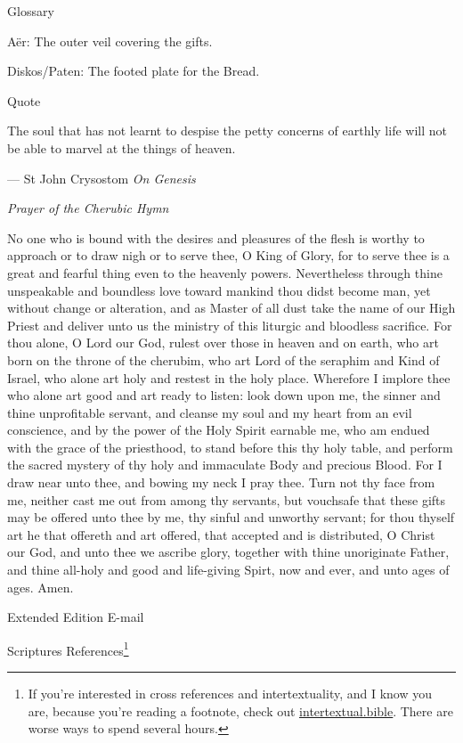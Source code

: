 \documentclass[
]{article}
\begin{document}
Glossary

Aër: The outer veil covering the gifts.

Diskos/Paten: The footed plate for the Bread.

Quote

The soul that has not learnt to despise the petty concerns of earthly
life will not be able to marvel at the things of heaven.

--- St John Crysostom \emph{On Genesis}

\emph{Prayer of the Cherubic Hymn}

No one who is bound with the desires and pleasures of the flesh is
worthy to approach or to draw nigh or to serve thee, O King of Glory,
for to serve thee is a great and fearful thing even to the heavenly
powers. Nevertheless through thine unspeakable and boundless love toward
mankind thou didst become man, yet without change or alteration, and as
Master of all dust take the name of our High Priest and deliver unto us
the ministry of this liturgic and bloodless sacrifice. For thou alone, O
Lord our God, rulest over those in heaven and on earth, who art born on
the throne of the cherubim, who art Lord of the seraphim and Kind of
Israel, who alone art holy and restest in the holy place. Wherefore I
implore thee who alone art good and art ready to listen: look down upon
me, the sinner and thine unprofitable servant, and cleanse my soul and
my heart from an evil conscience, and by the power of the Holy Spirit
earnable me, who am endued with the grace of the priesthood, to stand
before this thy holy table, and perform the sacred mystery of thy holy
and immaculate Body and precious Blood. For I draw near unto thee, and
bowing my neck I pray thee. Turn not thy face from me, neither cast me
out from among thy servants, but vouchsafe that these gifts may be
offered unto thee by me, thy sinful and unworthy servant; for thou
thyself art he that offereth and art offered, that accepted and is
distributed, O Christ our God, and unto thee we ascribe glory, together
with thine unoriginate Father, and thine all-holy and good and
life-giving Spirt, now and ever, and unto ages of ages. Amen.

Extended Edition E-mail

Scriptures References\footnote{If you're interested in cross references
  and intertextuality, and I know you are, because you're reading a
  footnote, check out
  \href{http://intertextual.bible}{\ul{intertextual.bible}}. There are
  worse ways to spend several hours.}
\end{document}
